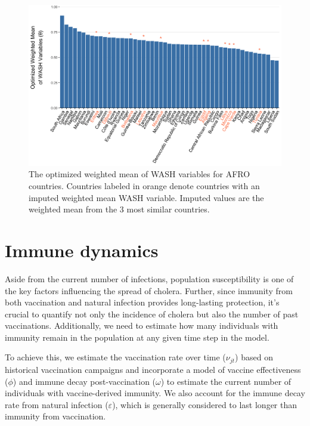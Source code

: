 \documentclass[
]{book}
\begin{document}
\begin{figure}

{\centering \includegraphics[width=1\linewidth]{figures/wash_index_by_country} 

}

\caption{The optimized weighted mean of WASH variables for AFRO countries. Countries labeled in orange denote countries with an imputed weighted mean WASH variable. Imputed values are the weighted mean from the 3 most similar countries.}\label{fig:wash-country}
\end{figure}

\section{Immune dynamics}\label{immune-dynamics}

Aside from the current number of infections, population susceptibility is one of the key factors influencing the spread of cholera. Further, since immunity from both vaccination and natural infection provides long-lasting protection, it's crucial to quantify not only the incidence of cholera but also the number of past vaccinations. Additionally, we need to estimate how many individuals with immunity remain in the population at any given time step in the model.

To achieve this, we estimate the vaccination rate over time (\(\nu_{jt}\)) based on historical vaccination campaigns and incorporate a model of vaccine effectiveness (\(\phi\)) and immune decay post-vaccination (\(\omega\)) to estimate the current number of individuals with vaccine-derived immunity. We also account for the immune decay rate from natural infection (\(\varepsilon\)), which is generally considered to last longer than immunity from vaccination.
\end{document}
